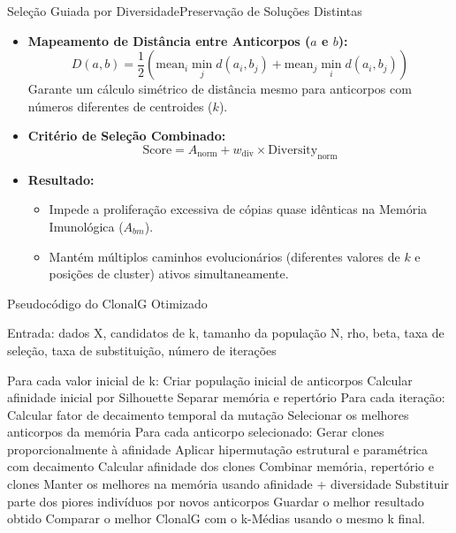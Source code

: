 \documentclass[aspectratio=169, 11pt]{beamer}
\begin{document}
\begin{frame}{Seleção Guiada por Diversidade}{Preservação de Soluções Distintas}
  \begin{itemize}
    \item \textbf{Mapeamento de Distância entre Anticorpos ($a$ e $b$):}
      \[ D(a, b) = \frac{1}{2} \left( \text{mean}_i \min_j d(a_i, b_j) + \text{mean}_j \min_i d(a_i, b_j) \right) \]
      Garante um cálculo simétrico de distância mesmo para anticorpos com números diferentes de centroides ($k$).
    \item \textbf{Critério de Seleção Combinado:}
      \[ \text{Score} = A_{\text{norm}} + w_{\text{div}} \times \text{Diversity}_{\text{norm}} \]
    \item \textbf{Resultado:}
      \begin{itemize}
        \item Impede a proliferação excessiva de cópias quase idênticas na Memória Imunológica ($A_{bm}$).
        \item Mantém múltiplos caminhos evolucionários (diferentes valores de $k$ e posições de cluster) ativos simultaneamente.
      \end{itemize}
  \end{itemize}
\end{frame}

\begin{frame}[fragile]{Pseudocódigo do ClonalG Otimizado}
\tiny
\begin{semiverbatim}
Entrada: dados X, candidatos de k, tamanho da população N,
         rho, beta, taxa de seleção, taxa de substituição,
         número de iterações

Para cada valor inicial de k:
    Criar população inicial de anticorpos
    Calcular afinidade inicial por Silhouette
    Separar memória e repertório
    Para cada iteração:
        Calcular fator de decaimento temporal da mutação
        Selecionar os melhores anticorpos da memória
        Para cada anticorpo selecionado:
            Gerar clones proporcionalmente à afinidade
            Aplicar hipermutação estrutural e paramétrica com decaimento
        Calcular afinidade dos clones
        Combinar memória, repertório e clones
        Manter os melhores na memória usando afinidade + diversidade
        Substituir parte dos piores indivíduos por novos anticorpos
        Guardar o melhor resultado obtido
Comparar o melhor ClonalG com o k-Médias usando o mesmo k final.
\end{semiverbatim}
\end{frame}
\end{document}
